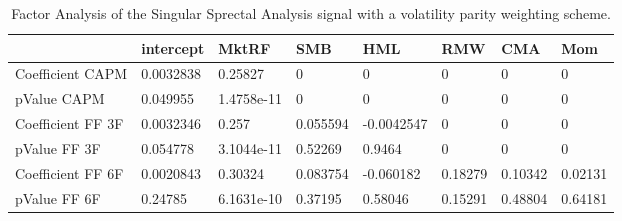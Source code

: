 \begin{table}[H]
\centering
\begin{tabular}{llllllll}
& intercept & MktRF & SMB & HML & RMW & CMA & Mom \\ 
\hline 
Coefficient CAPM & 0.0032838 & 0.25827 & 0 & 0 & 0 & 0 & 0 \\ 
pValue CAPM & 0.049955 & 1.4758e-11 & 0 & 0 & 0 & 0 & 0 \\ 
Coefficient FF 3F & 0.0032346 & 0.257 & 0.055594 & -0.0042547 & 0 & 0 & 0 \\ 
pValue FF 3F & 0.054778 & 3.1044e-11 & 0.52269 & 0.9464 & 0 & 0 & 0 \\ 
Coefficient FF 6F & 0.0020843 & 0.30324 & 0.083754 & -0.060182 & 0.18279 & 0.10342 & 0.02131 \\ 
pValue FF 6F & 0.24785 & 6.1631e-10 & 0.37195 & 0.58046 & 0.15291 & 0.48804 & 0.64181 \\ 
\hline
\end{tabular}
\caption{Factor Analysis of the Singular Sprectal Analysis signal with a volatility parity weighting scheme.}
\label{SSA_FACTOR}
\end{table}